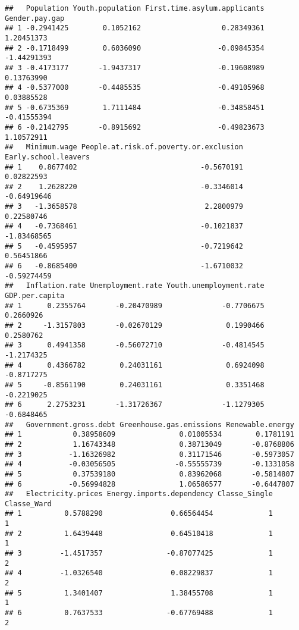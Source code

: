 \documentclass[
]{article}
\begin{document}
\begin{verbatim}
##   Population Youth.population First.time.asylum.applicants Gender.pay.gap
## 1 -0.2941425        0.1052162                   0.28349361     1.20451373
## 2 -0.1718499        0.6036090                  -0.09845354    -1.44291393
## 3 -0.4173177       -1.9437317                  -0.19608989     0.13763990
## 4 -0.5377000       -0.4485535                  -0.49105968     0.03885528
## 5 -0.6735369        1.7111484                  -0.34858451    -0.41555394
## 6 -0.2142795       -0.8915692                  -0.49823673     1.10572911
##   Minimum.wage People.at.risk.of.poverty.or.exclusion Early.school.leavers
## 1    0.8677402                             -0.5670191           0.02822593
## 2    1.2628220                             -0.3346014          -0.64919646
## 3   -1.3658578                              2.2800979           0.22580746
## 4   -0.7368461                             -0.1021837          -1.83468565
## 5   -0.4595957                             -0.7219642           0.56451866
## 6   -0.8685400                             -1.6710032          -0.59274459
##   Inflation.rate Unemployment.rate Youth.unemployment.rate GDP.per.capita
## 1      0.2355764       -0.20470989              -0.7706675      0.2660926
## 2     -1.3157803       -0.02670129               0.1990466      0.2580762
## 3      0.4941358       -0.56072710              -0.4814545     -1.2174325
## 4      0.4366782        0.24031161               0.6924098     -0.8717275
## 5     -0.8561190        0.24031161               0.3351468     -0.2219025
## 6      2.2753231       -1.31726367              -1.1279305     -0.6848465
##   Government.gross.debt Greenhouse.gas.emissions Renewable.energy
## 1            0.38958609               0.01005534        0.1781191
## 2            1.16743348               0.38713049       -0.8768806
## 3           -1.16326982               0.31171546       -0.5973057
## 4           -0.03056505              -0.55555739       -0.1331058
## 5            0.37539180               0.83962068       -0.5814807
## 6           -0.56994828               1.06586577       -0.6447807
##   Electricity.prices Energy.imports.dependency Classe_Single Classe_Ward
## 1          0.5788290                0.66564454             1           1
## 2          1.6439448                0.64510418             1           1
## 3         -1.4517357               -0.87077425             1           2
## 4         -1.0326540                0.08229837             1           2
## 5          1.3401407                1.38455708             1           1
## 6          0.7637533               -0.67769488             1           2
\end{verbatim}
\end{document}
